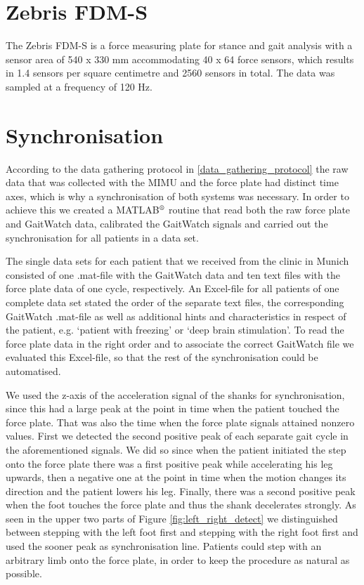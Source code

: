 \section{Zebris FDM-S}

The Zebris FDM-S \cite{zebris_force_plate_2013} is a force measuring plate for stance and gait analysis with a sensor area of 540 x 330 mm accommodating 40 x 64 force sensors, which results in 1.4 sensors per square centimetre and 2560 sensors in total. The data was sampled at a frequency of 120 Hz.

\section{Synchronisation}

According to the data gathering protocol in \ref{data_gathering_protocol} the raw data that was collected with the MIMU and the force plate had distinct time axes, which is why a synchronisation of both systems was necessary. In order to achieve this we created a MATLAB$\textsuperscript{\textregistered}$ routine that read both the raw force plate and GaitWatch data, calibrated the GaitWatch signals and carried out the synchronisation for all patients in a data set.

The single data sets for each patient that we received from the clinic in Munich consisted of one .mat-file with the GaitWatch data and ten text files with the force plate data of one cycle, respectively. An Excel-file for all patients of one complete data set stated the order of the separate text files, the corresponding GaitWatch .mat-file as well as additional hints and characteristics in respect of the patient, e.g. `patient with freezing' or `deep brain stimulation'. To read the force plate data in the right order and to associate the correct GaitWatch file we evaluated this Excel-file, so that the rest of the synchronisation could be automatised.

We used the z-axis of the acceleration signal of the shanks for synchronisation, since this had a large peak at the point in time when the patient touched the force plate. That was also the time when the force plate signals attained nonzero values.  First we detected the second positive peak of each separate gait cycle in the aforementioned signals. We did so since when the patient initiated the step onto the force plate there was a first positive peak while accelerating his leg upwards, then a negative one at the point in time when the motion changes its direction and the patient lowers his leg. Finally, there was a second positive peak when the foot touches the force plate and thus the shank decelerates strongly. As seen in the upper two parts of Figure \ref{fig:left_right_detect} we distinguished between stepping with the left foot first and stepping with the right foot first and used the sooner peak as synchronisation line. Patients could step with an arbitrary limb onto the force plate, in order to keep the procedure as natural as possible.



